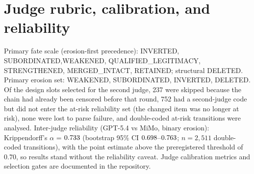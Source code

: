\section{Judge rubric, calibration, and reliability}\label{app:rubric}
Primary fate scale (erosion-first precedence): INVERTED, SUBORDINATED,\linebreak WEAKENED, QUALIFIED\_LEGITIMACY, STRENGTHENED, MERGED\_INTACT, RETAINED; structural DELETED.
Primary erosion set: WEAKENED, SUBORDINATED, INVERTED, DELETED.
Of the \NMimoSelected{} design slots selected for the second judge, 237 were skipped because the chain had already been censored before that round, 752 had a second-judge code but did not enter the at-risk reliability set (the changed item was no longer at risk), none were lost to parse failure, and \NMimoAnalysed{} double-coded at-risk transitions were analysed.
Inter-judge reliability (GPT-5.4 vs MiMo, binary erosion): Krippendorff's $\alpha$ = $0.733$ (bootstrap 95\% CI $0.698$--$0.763$; $n = 2{,}511$ double-coded transitions), with the point estimate above the preregistered threshold of 0.70, so results stand without the reliability caveat.
Judge calibration metrics and selection gates are documented in the repository.
